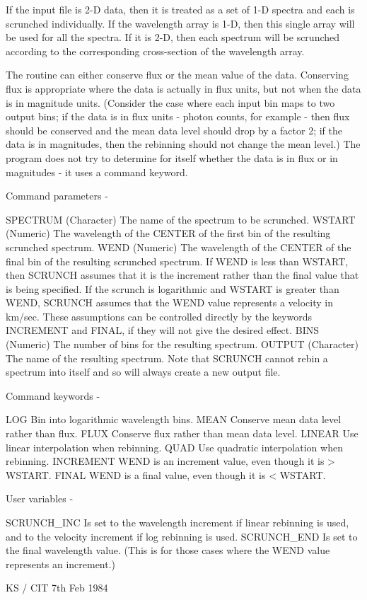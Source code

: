\begin{description}
\begin{terminalv}
 If the input file is 2-D data, then it is treated as a set of
 1-D spectra and each is scrunched individually.   If the wavelength
 array is 1-D, then this single array will be used for all
 the spectra.  If it is 2-D, then each spectrum will be scrunched
 according to the corresponding cross-section of the wavelength
 array.

 The routine can either conserve flux or the mean value
 of the data.  Conserving flux is appropriate where the data is
 actually in flux units, but not when the data is in magnitude
 units.  (Consider the case where each input bin maps to two
 output bins; if the data is in flux units - photon counts, for
 example - then flux should be conserved and the mean data level
 should drop by a factor 2; if the data is in magnitudes, then
 the rebinning should not change the mean level.)  The program
 does not try to determine for itself whether the data is in flux
 or in magnitudes - it uses a command keyword.

 Command parameters -

 SPECTRUM     (Character) The name of the spectrum to be scrunched.
 WSTART       (Numeric) The wavelength of the CENTER of the first
              bin of the resulting scrunched spectrum.
 WEND         (Numeric) The wavelength of the CENTER of the final
              bin of the resulting scrunched spectrum.  If WEND is
              less than WSTART, then SCRUNCH assumes that it is the
              increment rather than the final value that is being
              specified.  If the scrunch is logarithmic and WSTART
              is greater than WEND, SCRUNCH assumes that the WEND
              value represents a velocity in km/sec.  These
              assumptions can be controlled directly by the keywords
              INCREMENT and FINAL, if they will not give the desired
              effect.
 BINS         (Numeric) The number of bins for the resulting spectrum.
 OUTPUT       (Character) The name of the resulting spectrum.
              Note that SCRUNCH cannot rebin a spectrum into itself
              and so will always create a new output file.

 Command keywords -

 LOG          Bin into logarithmic wavelength bins.
 MEAN         Conserve mean data level rather than flux.
 FLUX         Conserve flux rather than mean data level.
 LINEAR       Use linear interpolation when rebinning.
 QUAD         Use quadratic interpolation when rebinning.
 INCREMENT    WEND is an increment value, even though it is > WSTART.
 FINAL        WEND is a final value, even though it is < WSTART.

 User variables -

 SCRUNCH_INC  Is set to the wavelength increment if linear
              rebinning is used, and to the velocity increment if
              log rebinning is used.
 SCRUNCH_END  Is set to the final wavelength value.  (This is for
              those cases where the WEND value represents an
              increment.)

                                          KS / CIT 7th Feb 1984
\end{terminalv}
\end{description}
